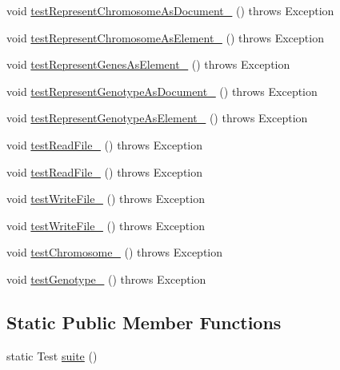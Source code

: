 \begin{DoxyCompactItemize}
\item 
void \hyperlink{classorg_1_1jgap_1_1xml_1_1_x_m_l_manager_test_a9e749d8b13a568ef47b6031cfc93ec88}{test\-Represent\-Chromosome\-As\-Document\-\_} ()  throws Exception 
\item 
void \hyperlink{classorg_1_1jgap_1_1xml_1_1_x_m_l_manager_test_acf4d3da562fbff6fce639563bd334ba4}{test\-Represent\-Chromosome\-As\-Element\-\_} ()  throws Exception 
\item 
void \hyperlink{classorg_1_1jgap_1_1xml_1_1_x_m_l_manager_test_a8f937b8b6da87d0928b3cadd9a6ed045}{test\-Represent\-Genes\-As\-Element\-\_} ()  throws Exception 
\item 
void \hyperlink{classorg_1_1jgap_1_1xml_1_1_x_m_l_manager_test_a075c8269a4aa6de99fc845c173fff97f}{test\-Represent\-Genotype\-As\-Document\-\_} ()  throws Exception 
\item 
void \hyperlink{classorg_1_1jgap_1_1xml_1_1_x_m_l_manager_test_a54720c86535818e6d660e6b7917ac594}{test\-Represent\-Genotype\-As\-Element\-\_} ()  throws Exception 
\item 
void \hyperlink{classorg_1_1jgap_1_1xml_1_1_x_m_l_manager_test_a5038171e76916690a1cfcbae17d651c6}{test\-Read\-File\-\_} ()  throws Exception 
\item 
void \hyperlink{classorg_1_1jgap_1_1xml_1_1_x_m_l_manager_test_a54259c2a6572e4a57aa202ed969a1a55}{test\-Read\-File\-\_} ()  throws Exception 
\item 
void \hyperlink{classorg_1_1jgap_1_1xml_1_1_x_m_l_manager_test_ab9e52b7f53e05246c0ec32c3b6b89efa}{test\-Write\-File\-\_} ()  throws Exception 
\item 
void \hyperlink{classorg_1_1jgap_1_1xml_1_1_x_m_l_manager_test_a5c51f9c8e14dfdbbd963693294ebcf21}{test\-Write\-File\-\_} ()  throws Exception 
\item 
void \hyperlink{classorg_1_1jgap_1_1xml_1_1_x_m_l_manager_test_a480486e51c7675af4a60d220453a17f2}{test\-Chromosome\-\_} ()  throws Exception 
\item 
void \hyperlink{classorg_1_1jgap_1_1xml_1_1_x_m_l_manager_test_a5009e86d6fd6fbd919e257c8127c555f}{test\-Genotype\-\_} ()  throws Exception 
\end{DoxyCompactItemize}
\subsection*{Static Public Member Functions}
\begin{DoxyCompactItemize}
\item 
static Test \hyperlink{classorg_1_1jgap_1_1xml_1_1_x_m_l_manager_test_a5af99282b5b03a50eb801a9dcc53c789}{suite} ()
\end{DoxyCompactItemize}
